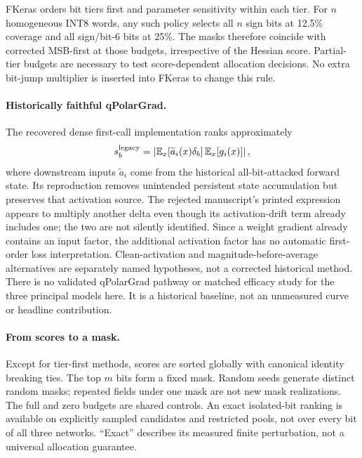 FKeras orders bit tiers first and parameter sensitivity within each tier. For $n$ homogeneous INT8 words, any such policy selects all $n$ sign bits at 12.5\% coverage and all sign/bit-6 bits at 25\%. The masks therefore coincide with corrected MSB-first at those budgets, irrespective of the Hessian score. Partial-tier budgets are necessary to test score-dependent allocation decisions. No extra bit-jump multiplier is inserted into FKeras to change this rule.

\paragraph{Historically faithful qPolarGrad.}
The recovered dense first-call implementation ranks approximately
\begin{equation}
s_b^{\mathrm{legacy}}=\left|\mathbb{E}_x[\widetilde a_i(x)\delta_b]\,\mathbb{E}_x[g_i(x)]\right|,
\end{equation}
where downstream inputs
$\widetilde a_i$ come from the historical all-bit-attacked forward state. Its
reproduction removes unintended persistent state accumulation but preserves that
activation source. The rejected manuscript's printed expression appears to
multiply another delta even though its activation-drift term already includes
one; the two are not silently identified. Since a weight gradient already contains
an input factor, the additional activation factor has no automatic first-order
loss interpretation. Clean-activation and magnitude-before-average alternatives
are separately named hypotheses, not a corrected historical method. There is no
validated qPolarGrad pathway or matched efficacy study for the three principal
models here. It is a historical baseline, not an unmeasured curve or headline
contribution.

\paragraph{From scores to a mask.}
Except for tier-first methods, scores are sorted globally with canonical identity
breaking ties. The top $m$ bits form a fixed mask. Random seeds generate distinct
random masks; repeated fields under one mask are not new mask realizations.
The full and zero budgets are shared controls. An exact isolated-bit ranking is
available on explicitly sampled candidates and restricted pools, not over every
bit of all three networks. ``Exact'' describes its measured finite perturbation,
not a universal allocation guarantee.
